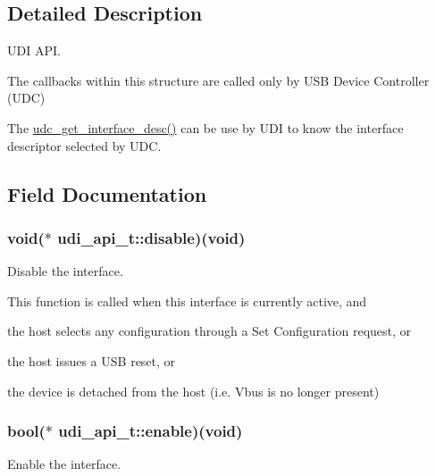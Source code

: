 \subsection{\-Detailed \-Description}
\-U\-D\-I \-A\-P\-I. 

\-The callbacks within this structure are called only by \-U\-S\-B \-Device \-Controller (\-U\-D\-C)

\-The \hyperlink{group__udc__group_ga7da79665b18d9c63db481ec59987ce66}{udc\-\_\-get\-\_\-interface\-\_\-desc()} can be use by \-U\-D\-I to know the interface descriptor selected by \-U\-D\-C. 

\subsection{\-Field \-Documentation}
\hypertarget{structudi__api__t_ab0ceaf0d506a357091ec69d5868bff7d}{
\subsubsection[{disable}]{\setlength{\rightskip}{0pt plus 5cm}void($\ast$ {\bf udi\-\_\-api\-\_\-t\-::disable})(void)}}
\label{structudi__api__t_ab0ceaf0d506a357091ec69d5868bff7d}


\-Disable the interface. 

\-This function is called when this interface is currently active, and
\begin{DoxyItemize}
\item the host selects any configuration through a \-Set \-Configuration request, or
\item the host issues a \-U\-S\-B reset, or
\item the device is detached from the host (i.\-e. \-Vbus is no longer present) 
\end{DoxyItemize}\hypertarget{structudi__api__t_a293117d7192553f153e0411b346dadc1}{
\subsubsection[{enable}]{\setlength{\rightskip}{0pt plus 5cm}bool($\ast$ {\bf udi\-\_\-api\-\_\-t\-::enable})(void)}}
\label{structudi__api__t_a293117d7192553f153e0411b346dadc1}


\-Enable the interface. 


